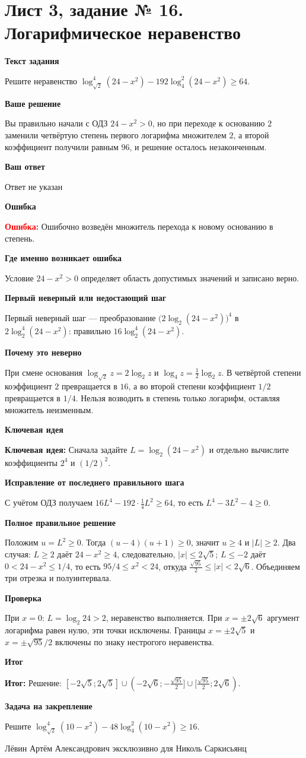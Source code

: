 \documentclass[11pt,a4paper]{article}
\newcommand{\Idea}{\textcolor{blue!60!black}{\textbf{Ключевая идея:}}}
\newcommand{\Res}{\textcolor{teal!60!black}{\textbf{Итог:}}}
\newcommand{\Heading}[2]{\par\medskip\textbf{#1}\par#2\par}
\begin{document}
\section*{Лист 3, задание № 16. Логарифмическое неравенство}
\Heading{Текст задания}{Решите неравенство $\log_{\sqrt2}^{4}(24-x^2)-192\log_4^{2}(24-x^2)\ge64$.}
\Heading{Ваше решение}{Вы правильно начали с ОДЗ $24-x^2>0$, но при переходе к основанию $2$ заменили четвёртую степень первого логарифма множителем $2$, а второй коэффициент получили равным $96$, и решение осталось незаконченным.}
\Heading{Ваш ответ}{Ответ не указан}
\Heading{Ошибка}{\textcolor{red}{\textbf{Ошибка:}} Ошибочно возведён множитель перехода к новому основанию в степень.}
\Heading{Где именно возникает ошибка}{Условие $24-x^2>0$ определяет область допустимых значений и записано верно.}
\Heading{Первый неверный или недостающий шаг}{Первый неверный шаг --- преобразование $\bigl(2\log_2(24-x^2)\bigr)^4$ в $2\log_2^4(24-x^2)$: правильно $16\log_2^4(24-x^2)$.}
\Heading{Почему это неверно}{При смене основания $\log_{\sqrt2}z=2\log_2z$ и $\log_4z=\frac12\log_2z$. В четвёртой степени коэффициент $2$ превращается в $16$, а во второй степени коэффициент $1/2$ превращается в $1/4$. Нельзя возводить в степень только логарифм, оставляя множитель неизменным.}
\Heading{Ключевая идея}{\Idea{} Сначала задайте $L=\log_2(24-x^2)$ и отдельно вычислите коэффициенты $2^4$ и $(1/2)^2$.}
\Heading{Исправление от последнего правильного шага}{С учётом ОДЗ получаем $16L^4-192\cdot\frac14L^2\ge64$, то есть $L^4-3L^2-4\ge0$.}
\Heading{Полное правильное решение}{Положим $u=L^2\ge0$. Тогда $(u-4)(u+1)\ge0$, значит $u\ge4$ и $|L|\ge2$. Два случая: $L\ge2$ даёт $24-x^2\ge4$, следовательно, $|x|\le2\sqrt5$; $L\le-2$ даёт $0<24-x^2\le1/4$, то есть $95/4\le x^2<24$, откуда $\frac{\sqrt{95}}2\le|x|<2\sqrt6$. Объединяем три отрезка и полуинтервала.}
\Heading{Проверка}{При $x=0$: $L=\log_2 24>2$, неравенство выполняется. При $x=\pm2\sqrt6$ аргумент логарифма равен нулю, эти точки исключены. Границы $x=\pm2\sqrt5$ и $x=\pm\sqrt{95}/2$ включены по знаку нестрогого неравенства.}
\Heading{Итог}{\Res{} Решение: $[-2\sqrt5;2\sqrt5]\cup(-2\sqrt6;-\frac{\sqrt{95}}2]\cup[\frac{\sqrt{95}}2;2\sqrt6)$.}
\Heading{Задача на закрепление}{Решите $\log_{\sqrt2}^{4}(10-x^2)-48\log_4^{2}(10-x^2)\ge16$.}
\par\vfill
\begin{center}\small Лёвин Артём Александрович эксклюзивно для Николь Саркисьянц\end{center}
\end{document}
